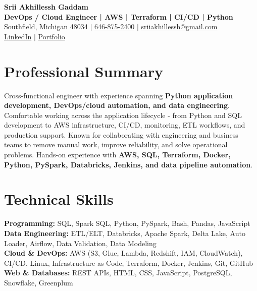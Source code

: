 \documentclass[letterpaper,10pt]{article}
\begin{document}
\fontsize{9.35pt}{10.45pt}\selectfont

\begin{center}
    {\LARGE \textbf{Srii Akhillessh Gaddam}} \\[-1pt]
    \textbf{DevOps / Cloud Engineer | AWS | Terraform | CI/CD | Python} \\[2pt]
    Southfield, Michigan 48034 $|$
    \href{tel:6468752400}{646-875-2400} $|$
    \href{mailto:sriiakhillessh@gmail.com}{sriiakhillessh@gmail.com} \\[1pt]
    \href{https://www.linkedin.com/in/srii-akhiilessh-gaddam-b48668191/}{LinkedIn} $|$
    \href{https://sriiakhillesshg.github.io/portfolio/}{Portfolio}
\end{center}
\vspace{-8pt}

\section{Professional Summary}
\small{Cross-functional engineer with experience spanning \textbf{Python application development, DevOps/cloud automation, and data engineering}. Comfortable working across the application lifecycle - from Python and SQL development to AWS infrastructure, CI/CD, monitoring, ETL workflows, and production support. Known for collaborating with engineering and business teams to remove manual work, improve reliability, and solve operational problems. Hands-on experience with \textbf{AWS, SQL, Terraform, Docker, Python, PySpark, Databricks, Jenkins, and data pipeline automation}.}

\section{Technical Skills}
\small{
\textbf{Programming:} SQL, Spark SQL, Python, PySpark, Bash, Pandas, JavaScript \\
\textbf{Data Engineering:} ETL/ELT, Databricks, Apache Spark, Delta Lake, Auto Loader, Airflow, Data Validation, Data Modeling \\
\textbf{Cloud \& DevOps:} AWS (S3, Glue, Lambda, Redshift, IAM, CloudWatch), CI/CD, Linux, Infrastructure as Code, Terraform, Docker, Jenkins, Git, GitHub \\
\textbf{Web \& Databases:} REST APIs, HTML, CSS, JavaScript, PostgreSQL, Snowflake, Greenplum
}
\end{document}
